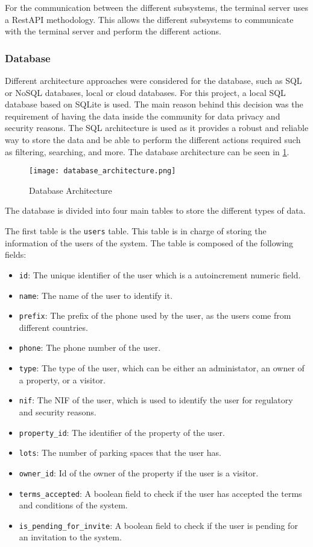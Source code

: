 For the communication between the different subsystems, the terminal server uses a RestAPI methodology. This allows the different subsystems to communicate with the terminal server and perform the different actions.

\subsubsection{Database}

Different architecture approaches were considered for the database, such as SQL or NoSQL databases, local or cloud databases. For this project, a local SQL database based on SQLite is used. The main reason behind this decision was the requirement of having the data inside the community for data privacy and security reasons. The SQL architecture is used as it provides a robust and reliable way to store the data and be able to perform the different actions required such as filtering, searching, and more. The database architecture can be seen in \cref{fig:database_architecture}.

\begin{figure}
	\texttt{[image: database\_architecture.png]}
	\caption{Database Architecture}\label{fig:database_architecture}
\end{figure}

The database is divided into four main tables to store the different types of data.

The first table is the \texttt{users} table. This table is in charge of storing the information of the users of the system. The table is composed of the following fields:

\begin{itemize}
	\item \texttt{id}: The unique identifier of the user which is a autoincrement numeric field.
	\item \texttt{name}: The name of the user to identify it.
	\item \texttt{prefix}: The prefix of the phone used by the user, as the users come from different countries.
	\item \texttt{phone}: The phone number of the user.
	\item \texttt{type}: The type of the user, which can be either an administator, an owner of a property, or a visitor.
	\item \texttt{nif}: The NIF of the user, which is used to identify the user for regulatory and security reasons.
	\item \texttt{property\_id}: The identifier of the property of the user.
	\item \texttt{lots}: The number of parking spaces that the user has.
	\item \texttt{owner\_id}: Id of the owner of the property if the user is a visitor.
	\item \texttt{terms\_accepted}: A boolean field to check if the user has accepted the terms and conditions of the system.
	\item \texttt{is\_pending\_for\_invite}: A boolean field to check if the user is pending for an invitation to the system.
\end{itemize}

